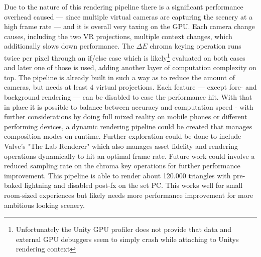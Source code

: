 Due to the nature of this rendering pipeline there is a significant performance 
overhead caused --- since multiple virtual cameras are capturing the scenery at 
a high frame rate --- and it is overall very taxing on the GPU. Each camera 
change causes, including the two VR projections, multiple context changes, 
which additionally slows down performance. The $\Delta E$ chroma keying 
operation runs twice per pixel through an if/else case which is 
likely\footnote{Unfortunately the Unity GPU profiler does not provide that 
data and external GPU debuggers seem to simply crash while attaching to Unitys 
rendering context} evaluated on both cases and later one of those is used, 
adding another layer of computation complexity on top. 
\newline
The pipeline is already built in such a way as to reduce the amount of cameras, 
but needs at least 4 virtual projections. Each feature --- except fore- and 
background  rendering --- can be disabled to ease the performance hit. With 
that in place it is possible to balance between accuracy and computation speed 
- with further considerations by doing full mixed reality on mobile phones or 
different performing devices, a dynamic rendering pipeline could be created 
that manages composition modes on runtime. Further exploration could be done to 
include Valve's "The Lab Renderer" which also manages asset fidelity and 
rendering operations dynamically to hit an optimal frame rate. Future work 
could involve a reduced sampling rate on the chroma key operations for further 
performance improvement.
\newline
This pipeline is able to render about 120.000 triangles with pre-baked 
lightning and disabled post-fx on the set PC. This works well for small 
room-sized experiences but likely needs more performance improvement for 
more ambitious looking scenery.